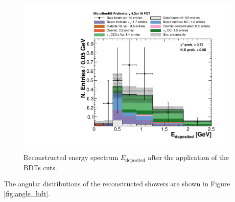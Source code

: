 \begin{figure}[htbp]
\centering
  \includegraphics[width=0.75\linewidth]{figures/h_reco_energy_bdt.pdf}
  \caption{Reconstructed energy spectrum $E_{\mathrm{deposited}}$ after the application of the BDTs cuts.}\label{fig:reco_bdt}
\end{figure}

The angular distributions of the reconstructed showers are shown in Figure \ref{fig:angle_bdt}. 

